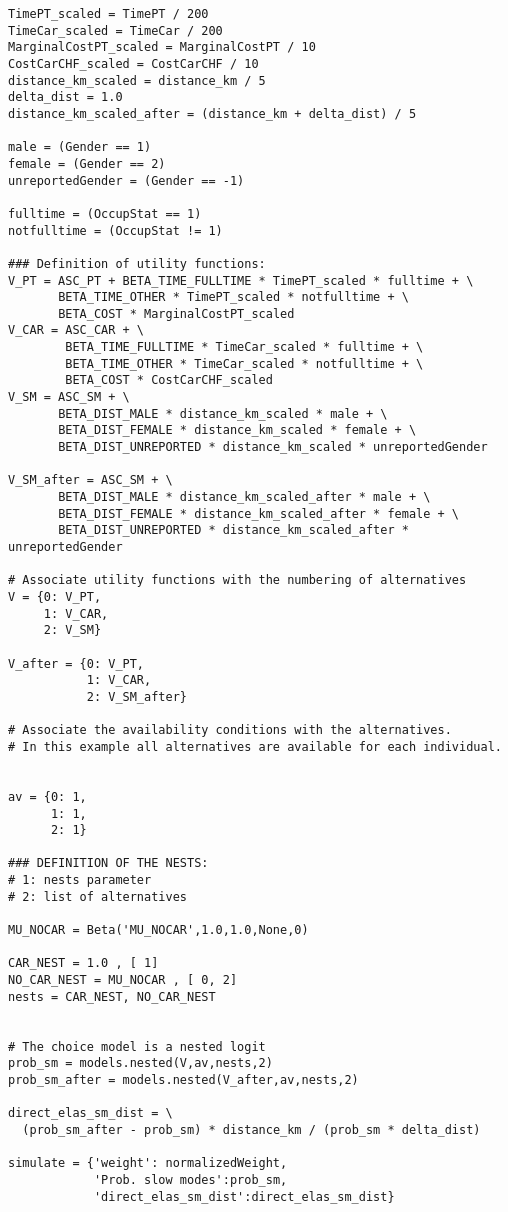 \documentclass[12pt,a4paper]{article}
\begin{document}
\begin{lstlisting}[style=numbers]
TimePT_scaled = TimePT / 200
TimeCar_scaled = TimeCar / 200
MarginalCostPT_scaled = MarginalCostPT / 10
CostCarCHF_scaled = CostCarCHF / 10
distance_km_scaled = distance_km / 5
delta_dist = 1.0
distance_km_scaled_after = (distance_km + delta_dist) / 5

male = (Gender == 1)
female = (Gender == 2)
unreportedGender = (Gender == -1)

fulltime = (OccupStat == 1)
notfulltime = (OccupStat != 1)

### Definition of utility functions:
V_PT = ASC_PT + BETA_TIME_FULLTIME * TimePT_scaled * fulltime + \
       BETA_TIME_OTHER * TimePT_scaled * notfulltime + \
       BETA_COST * MarginalCostPT_scaled
V_CAR = ASC_CAR + \
        BETA_TIME_FULLTIME * TimeCar_scaled * fulltime + \
        BETA_TIME_OTHER * TimeCar_scaled * notfulltime + \
        BETA_COST * CostCarCHF_scaled
V_SM = ASC_SM + \
       BETA_DIST_MALE * distance_km_scaled * male + \
       BETA_DIST_FEMALE * distance_km_scaled * female + \
       BETA_DIST_UNREPORTED * distance_km_scaled * unreportedGender

V_SM_after = ASC_SM + \
       BETA_DIST_MALE * distance_km_scaled_after * male + \
       BETA_DIST_FEMALE * distance_km_scaled_after * female + \
       BETA_DIST_UNREPORTED * distance_km_scaled_after * unreportedGender

# Associate utility functions with the numbering of alternatives
V = {0: V_PT,
     1: V_CAR,
     2: V_SM}

V_after = {0: V_PT,
           1: V_CAR,
           2: V_SM_after}

# Associate the availability conditions with the alternatives.
# In this example all alternatives are available for each individual.


av = {0: 1,
      1: 1,
      2: 1}

### DEFINITION OF THE NESTS:
# 1: nests parameter
# 2: list of alternatives

MU_NOCAR = Beta('MU_NOCAR',1.0,1.0,None,0)

CAR_NEST = 1.0 , [ 1]
NO_CAR_NEST = MU_NOCAR , [ 0, 2]
nests = CAR_NEST, NO_CAR_NEST


# The choice model is a nested logit
prob_sm = models.nested(V,av,nests,2)
prob_sm_after = models.nested(V_after,av,nests,2)

direct_elas_sm_dist = \
  (prob_sm_after - prob_sm) * distance_km / (prob_sm * delta_dist)

simulate = {'weight': normalizedWeight,
            'Prob. slow modes':prob_sm,
            'direct_elas_sm_dist':direct_elas_sm_dist}


\end{lstlisting}
\end{document}
